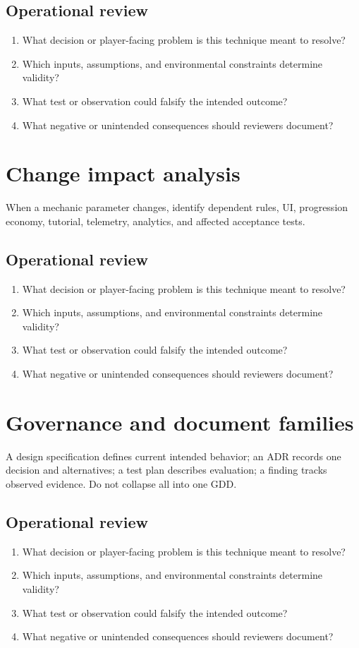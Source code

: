 \documentclass[11pt]{article}
\begin{document}
\subsection{Operational review}
\begin{enumerate}
\item What decision or player-facing problem is this technique meant to resolve?
\item Which inputs, assumptions, and environmental constraints determine validity?
\item What test or observation could falsify the intended outcome?
\item What negative or unintended consequences should reviewers document?
\end{enumerate}

\section{Change impact analysis}
When a mechanic parameter changes, identify dependent rules, UI, progression economy, tutorial, telemetry, analytics, and affected acceptance tests.


\subsection{Operational review}
\begin{enumerate}
\item What decision or player-facing problem is this technique meant to resolve?
\item Which inputs, assumptions, and environmental constraints determine validity?
\item What test or observation could falsify the intended outcome?
\item What negative or unintended consequences should reviewers document?
\end{enumerate}

\section{Governance and document families}
A design specification defines current intended behavior; an ADR records one decision and alternatives; a test plan describes evaluation; a finding tracks observed evidence. Do not collapse all into one GDD.


\subsection{Operational review}
\begin{enumerate}
\item What decision or player-facing problem is this technique meant to resolve?
\item Which inputs, assumptions, and environmental constraints determine validity?
\item What test or observation could falsify the intended outcome?
\item What negative or unintended consequences should reviewers document?
\end{enumerate}
\end{document}
